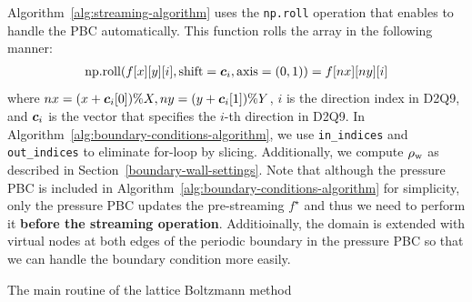 Algorithm~\ref{alg:streaming-algorithm} uses
the {\tt np.roll} operation that enables
to handle the PBC automatically.
This function rolls the array in the following manner:
\begin{equation*}
\begin{aligned}
  \text{np.roll}(f[x][y][i], \text{shift}=\boldsymbol{c}_i, \text{axis}=(0, 1)) =
  f[nx][ny][i] \\
\end{aligned}
\end{equation*}
where
$nx = (x + \boldsymbol{c}_i[0]) \% X, ny = (y + \boldsymbol{c}_i[1]) \% Y$,
$i$ is the direction index in D2Q9, and $\boldsymbol{c}_i$ is the vector
that specifies the $i$-th direction in D2Q9.
In Algorithm~\ref{alg:boundary-conditions-algorithm},
we use {\tt in\_indices} and {\tt out\_indices}
to eliminate for-loop by slicing.
Additionally, we compute $\rho_{\rm w}$ as described in Section~\ref{boundary-wall-settings}.
Note that 
although the pressure PBC is included in Algorithm~\ref{alg:boundary-conditions-algorithm}
for simplicity,
only the pressure PBC updates the pre-streaming $f^\star$
and thus we need to perform it {\bf before the streaming operation}.
Additioinally, the domain is extended with virtual nodes 
at both edges of the periodic boundary in the pressure PBC
so that we can handle the boundary condition more easily. 


\begin{algorithm}[tb]
  \caption{The main routine of the lattice Boltzmann method}
  \label{alg:lattice-boltzmann-method-algorithm}
  \begin{algorithmic}[1]
     
    \State{$\rho(\xv, 0) = \rho_0, \uv(\xv, 0) = \uv_0$ for all $\xv \in [0, X) \times [0, Y)$}
    \EndFor
    \EndFunction
  \end{algorithmic}
\end{algorithm}

